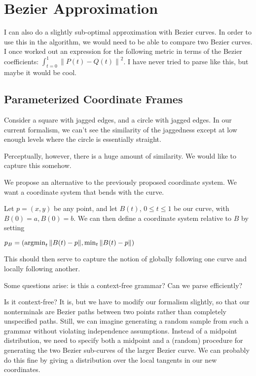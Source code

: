 \documentclass{article}
\begin{document}
\section{Bezier Approximation}

I can also do a slightly sub-optimal approximation with Bezier
curves. In order to use this in the algorithm, we would need to be
able to compare two Bezier curves. I once worked out an expression for
the following metric in terms of the Bezier coefficients: $
\int_{t=0}^1 \left\| P(t) - Q(t) \right\|^2$. I have never tried to
parse like this, but maybe it would be cool.

\subsection{Parameterized Coordinate Frames}

Consider a square with jagged edges, and a circle with jagged edges.
In our current formalism, we can't see the similarity of the
jaggedness except at low enough levels where the circle is essentially
straight.

Perceptually, however, there is a huge amount of similarity.
We would like to capture this somehow.

We propose an alternative to the previously proposed coordinate system.
We want a coordinate system that bends with the curve.

Let $p=(x,y)$ be any point, and let $B(t)$, $0\le t\le 1$ be our
curve, with $B(0)=a, B(0)=b$. We can then define a coordinate system
relative to $B$ by setting

$p_B = (\operatorname{argmin}_t \| B(t) - p\|, \min_t \| B(t) - p\|)$

This should then serve to capture the notion of globally following one
curve and locally following another.

Some questions arise: is this a context-free grammar? Can we parse
efficiently?

Is it context-free? It is, but we have to modify our formalism
slightly, so that our nonterminals are Bezier paths between two points
rather than completely unspecified paths. Still, we can imagine
generating a random sample from such a grammar without violating
independence assumptions. Instead of a midpoint distribution, we need
to specify both a midpoint and a (random) procedure for generating the
two Bezier sub-curves of the larger Bezier curve. We can probably do
this fine by giving a distribution over the local tangents in our new
coordinates.
\end{document}
